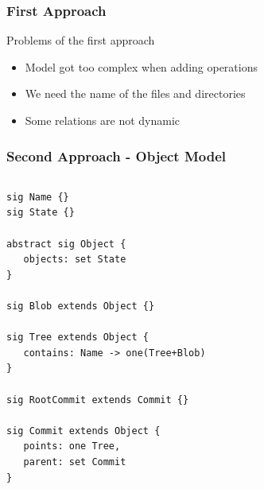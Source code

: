 \documentclass{beamer}
\begin{document}
\begin{frame}[fragile]
   \frametitle{First Approach}
   \begin{block}{Problems of the first approach}
      \begin{itemize}
         \item Model got too complex when adding operations
         \item We need the name of the files and directories
         \item Some relations are not dynamic
      \end{itemize}
   \end{block}
\end{frame}


\begin{frame}[fragile]
   \frametitle{Second Approach - Object Model}
   \tiny
   \begin{columns}[c]
      \column{1.5in}
   \begin{lstlisting}
sig Name {}
sig State {}

abstract sig Object {
   objects: set State
}

sig Blob extends Object {}

sig Tree extends Object {
   contains: Name -> one(Tree+Blob)
}

sig RootCommit extends Commit {}

sig Commit extends Object {
   points: one Tree,
   parent: set Commit
}

\end{lstlisting}
   \column{1.5in}
   \end{columns}

\end{frame}
\end{document}
